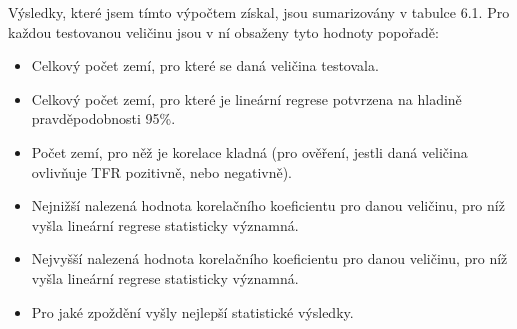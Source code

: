 \documentclass[thesis=M,czech]{FITthesis}[2022/10/08]
\begin{document}
Výsledky, které jsem tímto výpočtem získal, jsou sumarizovány v tabulce 6.1. Pro každou testovanou veličinu jsou v ní obsaženy tyto hodnoty popořadě:
\begin{itemize}
    \item Celkový počet zemí, pro které se daná veličina testovala.

    
    \item Celkový počet zemí, pro které je lineární regrese potvrzena na hladině pravděpodobnosti 95\%.

    \item Počet zemí, pro něž je korelace kladná (pro ověření, jestli daná veličina ovlivňuje TFR pozitivně, nebo negativně).
    
    \item Nejnižší nalezená hodnota korelačního koeficientu pro danou veličinu, pro níž vyšla lineární regrese statisticky významná.

    \item Nejvyšší nalezená hodnota korelačního koeficientu pro danou veličinu, pro níž vyšla lineární regrese statisticky významná.

    \item Pro jaké zpoždění vyšly nejlepší statistické výsledky.


\end{itemize}
\end{document}
